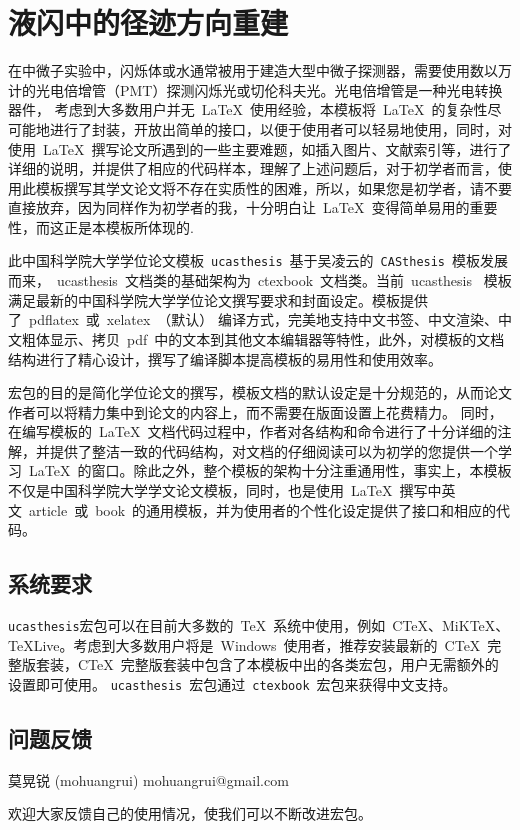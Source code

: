 
\chapter{液闪中的径迹方向重建}
\label{chap:chap3}
在中微子实验中，闪烁体或水通常被用于建造大型中微子探测器，需要使用数以万计的光电倍增管（PMT）探测闪烁光或切伦科夫光。光电倍增管是一种光电转换器件，
考虑到大多数用户并无~\LaTeX{}~使用经验，本模板将~\LaTeX{}~的复杂性尽可能地进行了封装，开放出简单的接口，以便于使用者可以轻易地使用，同时，对使用~\LaTeX{}~撰写论文所遇到的一些主要难题，如插入图片、文献索引等，进行了详细的说明，并提供了相应的代码样本，理解了上述问题后，对于初学者而言，使用此模板撰写其学文论文将不存在实质性的困难，所以，如果您是初学者，请不要直接放弃，因为同样作为初学者的我，十分明白让~\LaTeX{}~变得简单易用的重要性，而这正是本模板所体现的.

此中国科学院大学学位论文模板~\texttt{ucasthesis}~基于吴凌云的~\texttt{CASthesis}~模板发展而来，~ucasthesis~文档类的基础架构为~ctexbook~文档类。当前~ucasthesis~ 模板满足最新的中国科学院大学学位论文撰写要求和封面设定。模板提供了~pdflatex~或~xelatex~（默认） 编译方式，完美地支持中文书签、中文渲染、中文粗体显示、拷贝~pdf~中的文本到其他文本编辑器等特性，此外，对模板的文档结构进行了精心设计，撰写了编译脚本提高模板的易用性和使用效率。

宏包的目的是简化学位论文的撰写，模板文档的默认设定是十分规范的，从而论文作者可以将精力集中到论文的内容上，而不需要在版面设置上花费精力。 同时，在编写模板的~\LaTeX{}~文档代码过程中，作者对各结构和命令进行了十分详细的注解，并提供了整洁一致的代码结构，对文档的仔细阅读可以为初学的您提供一个学习~\LaTeX{}~的窗口。除此之外，整个模板的架构十分注重通用性，事实上，本模板不仅是中国科学院大学学文论文模板，同时，也是使用~\LaTeX{}~撰写中英文~article~或~book~的通用模板，并为使用者的个性化设定提供了接口和相应的代码。

\section{系统要求}

\texttt{ucasthesis}宏包可以在目前大多数的~\TeX{}~系统中使用，例如~C\TeX{}、MiK\TeX{}、\TeX{}Live。考虑到大多数用户将是~Windows~使用者，推荐安装最新的~C\TeX{}~完整版套装，C\TeX{}~完整版套装中包含了本模板中出的各类宏包，用户无需额外的设置即可使用。 \texttt{ucasthesis}~宏包通过~\texttt{ctexbook}~宏包来获得中文支持。

\section{问题反馈}

\begin{center}
莫晃锐 (mohuangrui) \quad mohuangrui@gmail.com
\end{center}

欢迎大家反馈自己的使用情况，使我们可以不断改进宏包。
